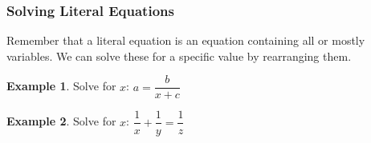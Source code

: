 \documentclass[addpoints,12pt]{exam}
\theoremstyle{definition}
\newtheorem{example}{Example}[subsection]
\begin{document}
\newpage

\subsubsection*{Solving Literal Equations}
Remember that a literal equation is an equation containing all or mostly variables. We can solve these for a specific value by rearranging them.

\begin{example}
Solve for $x$: $a = \dfrac{b}{x+c}$
\vspace{2.75in}
\end{example}

\begin{example}
Solve for $x$: $\dfrac{1}{x} + \dfrac{1}{y} = \dfrac{1}{z}$
\end{example}
\end{document}
